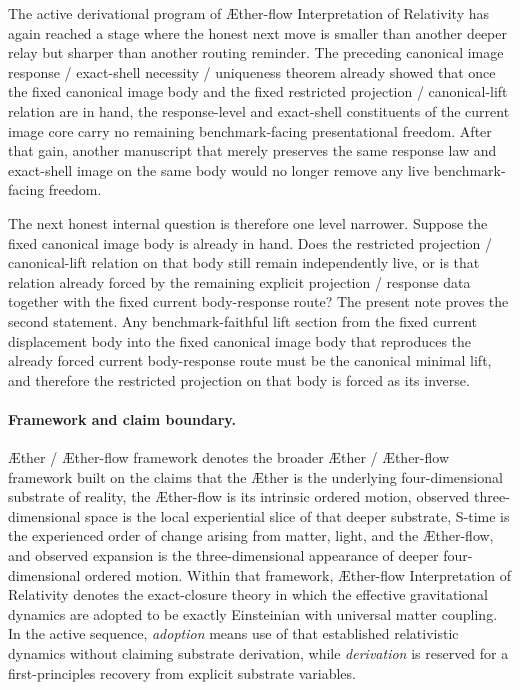 \documentclass[11pt]{article}
\newcommand{\Aether}{\AE{}ther}
\newcommand{\Aflow}{\AE{}ther-flow}
\newcommand{\TheoryName}{\Aflow{} Interpretation of Relativity}
\newcommand{\TheoryProgram}{\Aether{} / \Aflow{} framework}
\begin{document}
The active derivational program of \TheoryName{} has again reached a stage where the honest next move is smaller than another deeper relay but sharper than another routing reminder. The preceding canonical image response / exact-shell necessity / uniqueness theorem already showed that once the fixed canonical image body and the fixed restricted projection / canonical-lift relation are in hand, the response-level and exact-shell constituents of the current image core carry no remaining benchmark-facing presentational freedom. After that gain, another manuscript that merely preserves the same response law and exact-shell image on the same body would no longer remove any live benchmark-facing freedom.

The next honest internal question is therefore one level narrower. Suppose the fixed canonical image body is already in hand. Does the restricted projection / canonical-lift relation on that body still remain independently live, or is that relation already forced by the remaining explicit projection / response data together with the fixed current body-response route? The present note proves the second statement. Any benchmark-faithful lift section from the fixed current displacement body into the fixed canonical image body that reproduces the already forced current body-response route must be the canonical minimal lift, and therefore the restricted projection on that body is forced as its inverse.

\paragraph{Framework and claim boundary.}
\TheoryProgram{} denotes the broader \Aether{} / \Aflow{} framework built on the claims that the \Aether{} is the underlying four-dimensional substrate of reality, the \Aflow{} is its intrinsic ordered motion, observed three-dimensional space is the local experiential slice of that deeper substrate, S-time is the experienced order of change arising from matter, light, and the \Aflow{}, and observed expansion is the three-dimensional appearance of deeper four-dimensional ordered motion. Within that framework, \TheoryName{} denotes the exact-closure theory in which the effective gravitational dynamics are adopted to be exactly Einsteinian with universal matter coupling. In the active sequence, \emph{adoption} means use of that established relativistic dynamics without claiming substrate derivation, while \emph{derivation} is reserved for a first-principles recovery from explicit substrate variables.
\end{document}
